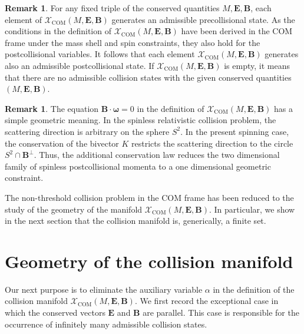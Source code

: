 \documentclass[12pt]{article}
\theoremstyle{plain}
\theoremstyle{definition}
\newtheorem{remark}[theorem]{Remark}
\begin{document}
\begin{remark}
For any fixed triple of the conserved quantities $M, {\bm E}, {\bm B}$, each element of $\mathcal{X}_\mathrm{COM}(M, {\bm E}, {\bm B})$ generates an admissible precollisional state. As the conditions in the definition of $\mathcal{X}_\mathrm{COM}(M,{\bm E}, {\bm B})$ have been derived in the COM frame under the mass shell and spin constraints, they also hold for the postcollisional variables. It follows that each element $\mathcal{X}_\mathrm{COM}(M,{\bm E}, {\bm B})$ generates also an admissible postcollisional state.
If $\mathcal{X}_\mathrm{COM}(M,{\bm E}, {\bm B})$ is empty, it means that there are no admissible collision states with the given conserved quantities $(M,{\bm E}, {\bm B})$.
\end{remark}

\begin{remark}
The equation ${\bm B}\cdot{\bm\omega}=0$ in the definition of $\mathcal{X}_\mathrm{COM}(M,{\bm E}, {\bm B})$ 
has a simple geometric meaning. In the spinless relativistic collision problem, the scattering direction is arbitrary on the sphere $S^2$. In the present spinning case, the conservation of the bivector $K$ restricts the scattering direction to the circle $S^2\cap{\bm B}^{\perp}$.
Thus, the additional conservation law reduces the two dimensional family of spinless postcollisional momenta to a one dimensional geometric constraint.
\end{remark}

The non-threshold collision problem in the COM frame has been reduced to the study of the geometry of the manifold $\mathcal{X}_\mathrm{COM}(M,{\bm E}, {\bm B})$. In particular, we show in the next section that the collision manifold is, generically, a finite set. 

\section{Geometry of the collision manifold}\label{geometry}
Our next purpose  is to eliminate the auxiliary variable $\alpha$ in the definition of the collision manifold $\mathcal{X}_\mathrm{COM}(M,{\bm E}, {\bm B})$. 
We first record the exceptional case in which the conserved vectors ${\bm E}$ and ${\bm B}$ are parallel. This case is responsible for the occurrence of infinitely many admissible collision states.
\end{document}
